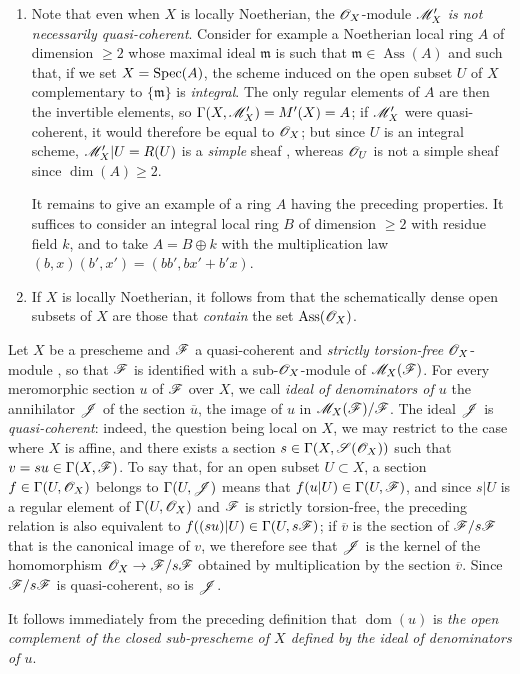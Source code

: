 \begin{remarks}[20.2.13]
\begin{enumerate}[label=(\roman*)]
  \item Note that even when $X$ is locally Noetherian, the $\mathscr{O}_X$-module $\mathscr{M}'_X$ \emph{is not necessarily quasi-coherent}.
  Consider for example a Noetherian local ring $A$ of dimension $\geq2$ whose maximal ideal $\mathfrak{m}$ is such that $\mathfrak{m}\in\operatorname{Ass}(A)$ and such that, if we set $X=\operatorname{Spec}(A)$, the scheme induced on the open subset $U$ of $X$ complementary to $\{\mathfrak{m}\}$ is \emph{integral}.
  The only regular elements of $A$ are then the invertible elements, so $\Gamma(X,\mathscr{M}'_X)=M'(X)=A$; if $\mathscr{M}'_X$ were quasi-coherent, it would therefore be equal to $\mathscr{O}_X$; but since $U$ is an integral scheme, $\mathscr{M}'_X|U=R(U)$ is a \emph{simple} sheaf , whereas $\mathscr{O}_U$ is not a simple sheaf since $\dim(A)\geq2$.

  It remains to give an example of a ring $A$ having the preceding properties.
  It suffices to consider an integral local ring $B$ of dimension $\geq2$ with residue field $k$, and to take $A=B\oplus k$ with the multiplication law $(b,x)(b',x')=(bb',bx'+b'x)$.

  \item If $X$ is locally Noetherian, it follows from  that the schematically dense open subsets of $X$ are those that \emph{contain} the set $\operatorname{Ass}(\mathscr{O}_X)$.
\end{enumerate}
\end{remarks}

\begin{env}[20.2.14]\label{IV.20.2.14}
Let $X$ be a prescheme and $\mathscr{F}$ a quasi-coherent and \emph{strictly torsion-free} $\mathscr{O}_X$-module , so that $\mathscr{F}$ is identified with a sub-$\mathscr{O}_X$-module of $\mathscr{M}_X(\mathscr{F})$.
For every meromorphic section $u$ of $\mathscr{F}$ over $X$, we call \emph{ideal of denominators of $u$} the annihilator $\mathscr{J}$ of the section $\overline{u}$, the image of $u$ in $\mathscr{M}_X(\mathscr{F})/\mathscr{F}$.
The ideal $\mathscr{J}$ is \emph{quasi-coherent}: indeed, the question being local on $X$, we may restrict to the case where $X$ is affine, and there exists a section $s\in\Gamma(X,\mathscr{S}(\mathscr{O}_X))$ such that $v=su\in\Gamma(X,\mathscr{F})$.
To say that, for an open subset $U\subset X$, a section $f\in\Gamma(U,\mathscr{O}_X)$ belongs to $\Gamma(U,\mathscr{J})$ means that $f(u|U)\in\Gamma(U,\mathscr{F})$, and since $s|U$ is a regular element of $\Gamma(U,\mathscr{O}_X)$ and $\mathscr{F}$ is strictly torsion-free, the preceding relation is also equivalent to $f((su)|U)\in\Gamma(U,s\mathscr{F})$; if $\overline{v}$ is the section of $\mathscr{F}/s\mathscr{F}$ that is the canonical image of $v$, we therefore see that $\mathscr{J}$ is the kernel of the homomorphism $\mathscr{O}_X\to\mathscr{F}/s\mathscr{F}$ obtained by multiplication by the section $\overline{v}$.
Since $\mathscr{F}/s\mathscr{F}$ is quasi-coherent, so is $\mathscr{J}$.

It follows immediately from the preceding definition that $\operatorname{dom}(u)$ is \emph{the open complement of the closed sub-prescheme of $X$ defined by the ideal of denominators of $u$}.
\end{env}

